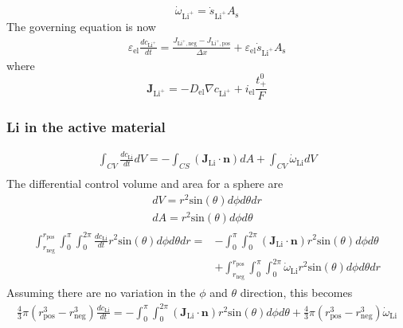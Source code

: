 \documentclass[12pt]{article}
\begin{document}
			\begin{equation}
				\dot{\omega}_{\text{Li}^+} = \dot{s}_{\text{Li}^+}A_\text{s}
			\end{equation}
			The governing equation is now
			\begin{gather}
				\varepsilon_{\text{el}}  \frac{dc_{\text{Li}^+}}{dt} = \frac{ J_{\text{Li}^+,\text{neg}} - J_{\text{Li}^+,\text{pos}} }{\Delta x} + \varepsilon_{\text{el}} \dot{s}_{\text{Li}^+}A_\text{s} 
			\end{gather}
			where
			\begin{equation}
				\mathbf{J}_{\text{Li}^+} = - D_\text{el} \nabla c_{\text{Li}^+} + i_\text{el} \frac{t_+^0}{F}
			\end{equation}
		\subsubsection{Li in the active material} 
			\begin{gather}
				\int_{CV} \frac{dc_{\text{Li}}}{dt} dV = -\int_{CS} (\mathbf{J}_{\text{Li}} \cdot \mathbf{n}) dA + \int_{CV} \dot{\omega}_{\text{Li}} dV\\
			\end{gather}
			The differential control volume and area for a sphere are
			\begin{gather}
				dV = r^2\text{sin}(\theta) d\phi d\theta dr\\
				dA = r^2\text{sin}(\theta) d\phi d\theta
			\end{gather}
			\begin{gather}
				\begin{split}
					\int_{r_\text{neg}}^{r_\text{pos}} \int_{0}^{\pi} \int_{0}^{2\pi} \frac{dc_{\text{Li}}}{dt} r^2\text{sin}(\theta) d\phi d\theta dr = &
					-\int_{0}^{\pi} \int_{0}^{2\pi} (\mathbf{J}_{\text{Li}} \cdot \mathbf{n}) r^2\text{sin}(\theta) d\phi d\theta \\
					&+ \int_{r_\text{neg}}^{r_\text{pos}} \int_{0}^{\pi} \int_{0}^{2\pi} \dot{\omega}_{\text{Li}} r^2\text{sin}(\theta) d\phi d\theta dr
				\end{split}
			\end{gather}
			Assuming there are no variation in the $\phi$ and $\theta$ direction, this becomes
			\begin{gather}
				\frac{4}{3} \pi \left( r_\text{pos}^3 - r_\text{neg}^3 \right)\frac{dc_{\text{Li}}}{dt}  =
				-\int_{0}^{\pi} \int_{0}^{2\pi} (\mathbf{J}_{\text{Li}} \cdot \mathbf{n}) r^2\text{sin}(\theta) d\phi d\theta 
				+ \frac{4}{3} \pi \left( r_\text{pos}^3 - r_\text{neg}^3 \right) \dot{\omega}_{\text{Li}}
			\end{gather}
\end{document}
